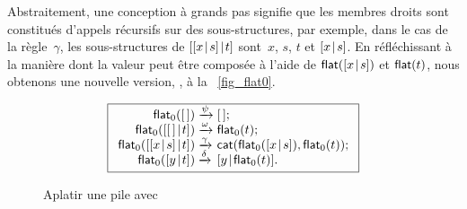 Abstraitement, une conception à grands pas signifie que les membres
droits sont constitués d'appels récursifs sur des sous-structures, par
exemple, dans le cas de la règle~\(\gamma\), les sous-structures de
\([{[{x}\!\mid\!{s}]}\!\mid\!{t}]\) sont~\(x\), \(s\), \(t\) et
\([{x}\!\mid\!{s}]\). En réfléchissant à la manière dont la valeur peut
être composée à l'aide de
\(\textsf{flat}([{x}\!\mid\!{s}])\) et
\(\textsf{flat}(t)\), nous obtenons une nouvelle version,
, à la
\fig~\vref{fig_flat0}.
\begin{figure}
\begin{equation*}
\boxed{%
\begin{array}{r@{\;}l@{\;}l}
\fun{flat}_0(\el)                   & \xrightarrow{\smash{\psi}} 
                                    & \el;\\
\fun{flat}_0(\cons{\el}{t})         & \xrightarrow{\smash{\omega}}
                                    & \fun{flat}_0(t);\\
\fun{flat}_0(\cons{\cons{x}{s}}{t}) & \xrightarrow{\smash{\gamma}}
        & \fun{cat}(\fun{flat}_0(\cons{x}{s}),\fun{flat}_0(t));\\
\fun{flat}_0(\cons{y}{t})           & \xrightarrow{\smash{\delta}}
                                    & \cons{y}{\fun{flat}_0(t)}.
\end{array}}
\end{equation*}
\caption{Aplatir une pile avec 
\label{fig_flat0}}
\end{figure}

